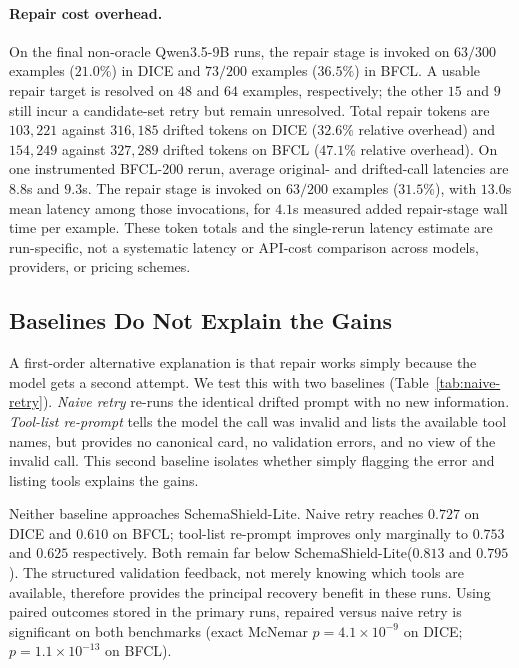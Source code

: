 \documentclass{llncs}
\newcommand{\method}{SchemaShield-Lite\xspace}
\begin{document}
\paragraph{Repair cost overhead.}
On the final non-oracle Qwen3.5-9B runs, the repair stage is invoked on $63/300$
examples ($21.0\%$) in DICE and $73/200$ examples ($36.5\%$) in BFCL\@. A usable
repair target is resolved on $48$ and $64$ examples, respectively; the other $15$
and $9$ still incur a candidate-set retry but remain unresolved. Total repair
tokens are $103{,}221$ against $316{,}185$ drifted tokens on DICE ($32.6\%$
relative overhead) and $154{,}249$ against $327{,}289$ drifted tokens on BFCL
($47.1\%$ relative overhead). On one instrumented BFCL-200 rerun, average
original- and drifted-call latencies are $8.8$s and $9.3$s. The repair stage is
invoked on $63/200$ examples ($31.5\%$), with $13.0$s mean latency among those
invocations, for $4.1$s measured added repair-stage wall time per example. These
token totals and the single-rerun latency estimate are run-specific, not a
systematic latency or API-cost comparison across models, providers, or pricing
schemes.

\subsection{Baselines Do Not Explain the Gains}
\label{sec:naive-retry}
A first-order alternative explanation is that repair works simply because the model
gets a second attempt. We test this with two baselines
(Table~\ref{tab:naive-retry}). \emph{Naive retry} re-runs the identical drifted
prompt with no new information. \emph{Tool-list re-prompt} tells the model the
call was invalid and lists the available tool names, but provides no canonical
card, no validation errors, and no view of the invalid call. This second baseline
isolates whether simply flagging the error and listing tools explains the gains.

Neither baseline approaches \method. Naive retry reaches $0.727$ on DICE and
$0.610$ on BFCL; tool-list re-prompt improves only marginally to $0.753$ and
$0.625$ respectively. Both remain far below \method ($0.813$ and $0.795$).
The structured validation feedback, not merely knowing which tools are
available, therefore provides the principal recovery benefit in these runs. Using
paired outcomes stored in the primary runs, repaired versus naive retry is significant
on both benchmarks
(exact McNemar $p=4.1\times 10^{-9}$ on DICE; $p=1.1\times 10^{-13}$ on BFCL).
\end{document}
